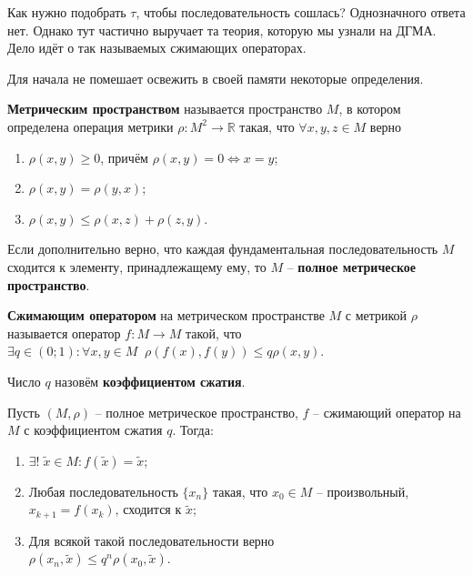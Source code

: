 \documentclass[../main.tex]{subfile}
\begin{document}
Как нужно подобрать $\tau$, чтобы последовательность сошлась? Однозначного ответа
нет. Однако тут частично выручает та теория, которую мы узнали на ДГМА. Дело
идёт о так называемых сжимающих операторах.

Для начала не помешает освежить в своей памяти некоторые определения.

\begin{define}
	\textbf{Метрическим пространством} называется пространство $M$, в
	котором определена операция метрики $\rho: M^2 \rightarrow \mathbb R $
	такая, что $\forall x, y, z \in M$ верно
	\begin{enumerate}
		\item $\rho(x,y)\ge 0$, причём $\rho(x,y) = 0 \Leftrightarrow x=y$;
		\item $\rho(x,y)=\rho(y,x)$;
		\item $\rho(x,y)\le \rho(x,z) + \rho(z,y)$.
	\end{enumerate}

	Если дополнительно верно, что каждая фундаментальная последовательность
	$M$ сходится к элементу, принадлежащему ему, то $M$ --
	\textbf{полное метрическое пространство}.
\end{define}

\begin{define}
	\textbf{Сжимающим оператором} на метрическом пространстве $M$ с метрикой
	$\rho$ называется оператор $f: M \rightarrow M$ такой, что\\
	$\exists q \in(0;1):\forall x,y \in M\;\; \rho(f(x),f(y)) \le q \rho(x,y)$.

	Число $q$ назовём \textbf{коэффициентом сжатия}.
\end{define}

\begin{theorem}
	Пусть $(M,\rho)$ -- полное метрическое пространство, $f$ -- сжимающий
	оператор на $M$ с коэффициентом сжатия $q$. Тогда:
	\begin{enumerate}
		\item $\exists!\;\widetilde{x}\in M: f(\widetilde{x})=\widetilde{x}$;
		\item Любая последовательность $\{x_n\}$ такая, что $x_0 \in M$ --
			произвольный, $x_{k+1}=f(x_k)$, сходится к $\widetilde{x}$;
		\item Для всякой такой последовательности верно\\
			$\rho(x_n, \widetilde{x}) \le q ^ n \rho(x_0, \widetilde{x})$.
	\end{enumerate}
\end{theorem}
\end{document}
